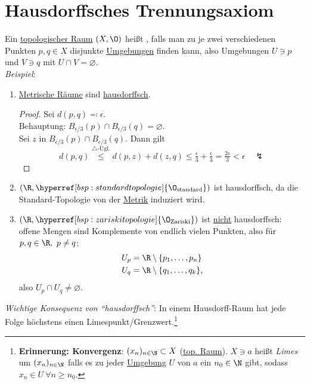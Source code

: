 \section{Hausdorffsches Trennungsaxiom}
\begin{remark}
  \label{def:hausdorffsch}
  Ein \hyperref[def:topologie]{topologischer Raum} $ (X,\O) $ heißt , falls man zu je zwei verschiedenen Punkten $ p,q \in X $ disjunkte \hyperref[def:umgebung]{Umgebungen} finden kann, also Umgebungen $ U \ni p $ und $ V \ni q $ mit $ U \cap V = \varnothing $. \\
  \emph{Beispiel}:
  \begin{enumerate}
    \item \hyperref[def:metrischerRaum]{Metrische Räume} sind \hyperref[def:hausdorffsch]{hausdorffsch}.
    \begin{proof}
       Sei $ d(p,q) \eqqcolon \epsilon $. \\
       Behauptung: $ B_{\epsilon/3}(p) \cap B_{\epsilon/3}(q) = \varnothing $. \\
       Sei $ z $ in $ B_{\epsilon/3}(p) \cap B_{\epsilon/3}(q) $. Dann gilt
       \begin{equation*}
         d(p,q) \overset{\triangle\text{-Ugl.}}{\leq} d(p,z)+d(z,q) \leq \tfrac{\epsilon}{3} + \tfrac{\epsilon}{3} = \tfrac{2\epsilon}{3} < \epsilon \quad \lightning
       \end{equation*}
     \end{proof} 
    \item $ (\R, \hyperref[bsp:standardtopologie]{\O_\text{standard}}) $ ist hausdorffsch, da die Standard-Topologie von der \hyperref[def:metrik]{Metrik} induziert wird.
    \item $ (\R, \hyperref[bsp:zariskitopologie]{\O_\text{Zariski}}) $ ist \underline{nicht} hausdorffsch: offene Mengen sind Komplemente von endlich vielen Punkten, also für $ p, q \in \R, \ p \neq q $:
    \begin{align*}
      U_p &= \R \setminus \{ p_1, \dots, p_n \} \\
      U_q &= \R \setminus \{ q_1, \dots, q_k \}\text{,}
    \end{align*}
    also $ U_p \cap U_q \neq \varnothing $.
  \end{enumerate}
  \emph{Wichtige Konsequenz von ``hausdorffsch''}: In einem Hausdorff-Raum hat jede Folge höchstens einen Limespunkt/Grenzwert.\footnote{\textbf{Erinnerung: Konvergenz}\label{def:konvergenz}: $ (x_n)_{n \in \N} \subset X $ (\hyperref[def:topologie]{top. Raum}). $ X \ni a $ heißt \emph{Limes} um $ (x_n)_{n \in \N} $ falls es zu jeder \hyperref[def:umgebung]{Umgebung} $ U $ von $ a $ ein $ n_0 \in \N $ gibt, sodass $ x_n \in U \ \forall n \geq n_0 $.}
\end{remark}

